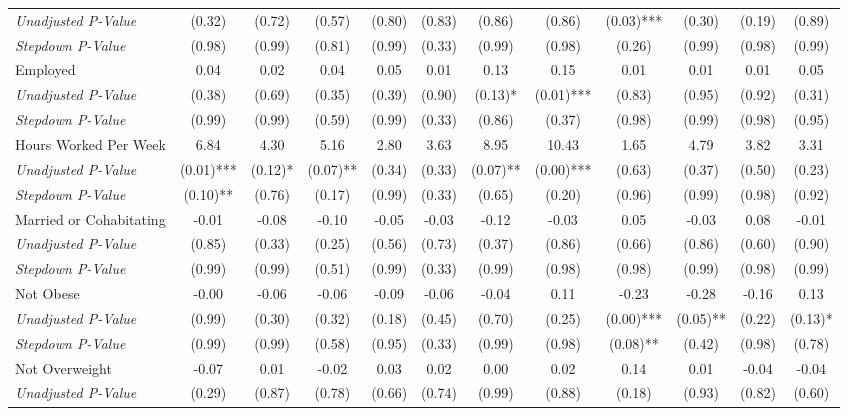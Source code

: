 \begin{tabular}{l c c c c c c c c c c c}
\quad \textit{Unadjusted P-Value} & (0.32) & (0.72) & (0.57) & (0.80) & (0.83) & (0.86) & (0.86) & (0.03)*** & (0.30) & (0.19) & (0.89) \\
\quad \textit{Stepdown P-Value} & (0.98) & (0.99) & (0.81) & (0.99) & (0.33) & (0.99) & (0.98) & (0.26) & (0.99) & (0.98) & (0.99) \\
Employed & 0.04 & 0.02 & 0.04 & 0.05 & 0.01 & 0.13 & 0.15 & 0.01 & 0.01 & 0.01 & 0.05 \\
\quad \textit{Unadjusted P-Value} & (0.38) & (0.69) & (0.35) & (0.39) & (0.90) & (0.13)* & (0.01)*** & (0.83) & (0.95) & (0.92) & (0.31) \\
\quad \textit{Stepdown P-Value} & (0.99) & (0.99) & (0.59) & (0.99) & (0.33) & (0.86) & (0.37) & (0.98) & (0.99) & (0.98) & (0.95) \\
Hours Worked Per Week & 6.84 & 4.30 & 5.16 & 2.80 & 3.63 & 8.95 & 10.43 & 1.65 & 4.79 & 3.82 & 3.31 \\
\quad \textit{Unadjusted P-Value} & (0.01)*** & (0.12)* & (0.07)** & (0.34) & (0.33) & (0.07)** & (0.00)*** & (0.63) & (0.37) & (0.50) & (0.23) \\
\quad \textit{Stepdown P-Value} & (0.10)** & (0.76) & (0.17) & (0.99) & (0.33) & (0.65) & (0.20) & (0.96) & (0.99) & (0.98) & (0.92) \\
Married or Cohabitating & -0.01 & -0.08 & -0.10 & -0.05 & -0.03 & -0.12 & -0.03 & 0.05 & -0.03 & 0.08 & -0.01 \\
\quad \textit{Unadjusted P-Value} & (0.85) & (0.33) & (0.25) & (0.56) & (0.73) & (0.37) & (0.86) & (0.66) & (0.86) & (0.60) & (0.90) \\
\quad \textit{Stepdown P-Value} & (0.99) & (0.99) & (0.51) & (0.99) & (0.33) & (0.99) & (0.98) & (0.98) & (0.99) & (0.98) & (0.99) \\
Not Obese & -0.00 & -0.06 & -0.06 & -0.09 & -0.06 & -0.04 & 0.11 & -0.23 & -0.28 & -0.16 & 0.13 \\
\quad \textit{Unadjusted P-Value} & (0.99) & (0.30) & (0.32) & (0.18) & (0.45) & (0.70) & (0.25) & (0.00)*** & (0.05)** & (0.22) & (0.13)* \\
\quad \textit{Stepdown P-Value} & (0.99) & (0.99) & (0.58) & (0.95) & (0.33) & (0.99) & (0.98) & (0.08)** & (0.42) & (0.98) & (0.78) \\
Not Overweight & -0.07 & 0.01 & -0.02 & 0.03 & 0.02 & 0.00 & 0.02 & 0.14 & 0.01 & -0.04 & -0.04 \\
\quad \textit{Unadjusted P-Value} & (0.29) & (0.87) & (0.78) & (0.66) & (0.74) & (0.99) & (0.88) & (0.18) & (0.93) & (0.82) & (0.60) \\

\end{tabular}

